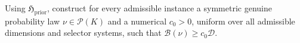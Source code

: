 Using \(\mathfrak H_{\mathrm{prior}}\), construct for every admissible instance a symmetric genuine probability law \(\nu\in\mathcal P(K)\) and a numerical \(c_0>0\), uniform over all admissible dimensions and selector systems, such that \(\mathcal B(\nu)\ge c_0\mathcal D\).